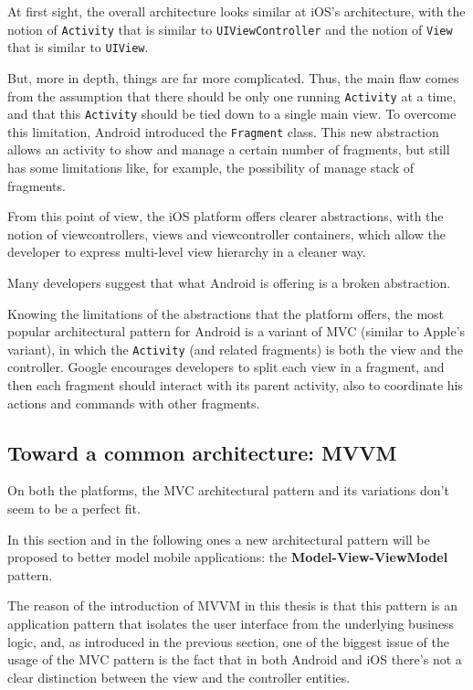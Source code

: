At first sight, the overall architecture looks similar at iOS's
architecture, with the notion of \texttt{Activity} that is similar to
\texttt{UIViewController} and the notion of \texttt{View} that is
similar to \texttt{UIView}.

But, more in depth, things are far more complicated. Thus, the main flaw
comes from the assumption that there should be only one running
\texttt{Activity} at a time, and that this \texttt{Activity} should be
tied down to a single main view. To overcome this limitation, Android
introduced the \texttt{Fragment} class. This new abstraction allows an
activity to show and manage a certain number of fragments, but still has
some limitations like, for example, the possibility of manage stack of
fragments.

From this point of view, the iOS platform offers clearer abstractions,
with the notion of viewcontrollers, views and viewcontroller containers,
which allow the developer to express multi-level view hierarchy in a
cleaner way.

Many developers suggest that what Android is offering is a broken
abstraction.

Knowing the limitations of the abstractions that the platform offers,
the most popular architectural pattern for Android is a variant of MVC
(similar to Apple's variant), in which the \texttt{Activity} (and
related fragments) is both the view and the controller. Google
encourages developers to split each view in a fragment, and then each
fragment should interact with its parent activity, also to coordinate
his actions and commands with other fragments.

\subsection{Toward a common architecture:
MVVM}\label{toward-a-common-architecture-mvvm}

On both the platforms, the MVC architectural pattern and its variations
don't seem to be a perfect fit.

In this section and in the following ones a new architectural pattern
will be proposed to better model mobile applications: the
\textbf{Model-View-ViewModel} pattern.

The reason of the introduction of MVVM in this thesis is that this
pattern is an application pattern that isolates the user interface from
the underlying business logic, and, as introduced in the previous
section, one of the biggest issue of the usage of the MVC pattern is the
fact that in both Android and iOS there's not a clear distinction
between the view and the controller entities.

